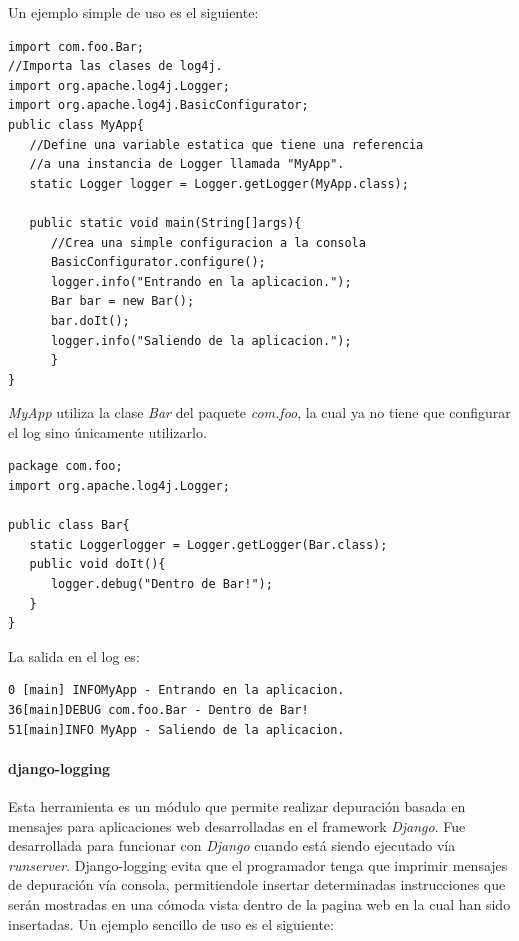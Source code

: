 \documentclass[12pt,legalpaper]{report}
\begin{document}
Un ejemplo simple de uso es el siguiente:
\begin{singlespace}
\begin{lstlisting}
import com.foo.Bar;
//Importa las clases de log4j.
import org.apache.log4j.Logger;
import org.apache.log4j.BasicConfigurator;
public class MyApp{
   //Define una variable estatica que tiene una referencia
   //a una instancia de Logger llamada "MyApp".
   static Logger logger = Logger.getLogger(MyApp.class);

   public static void main(String[]args){
      //Crea una simple configuracion a la consola
      BasicConfigurator.configure();
      logger.info("Entrando en la aplicacion.");
      Bar bar = new Bar();
      bar.doIt();
      logger.info("Saliendo de la aplicacion.");	
      }
}	
\end{lstlisting}
\end{singlespace}
	
\textit{MyApp} utiliza la clase \textit{Bar} del paquete \textit{com.foo}, la cual ya no tiene que configurar el log sino únicamente utilizarlo.

\begin{singlespace}
\begin{lstlisting}
package com.foo;
import org.apache.log4j.Logger;

public class Bar{
   static Loggerlogger = Logger.getLogger(Bar.class);
   public void doIt(){
      logger.debug("Dentro de Bar!");
   }
}
\end{lstlisting}
\end{singlespace}
	
La salida en el log es:

\begin{singlespace}
\begin{lstlisting}[style=consola,numbers=none]
0 [main] INFOMyApp - Entrando en la aplicacion.
36[main]DEBUG com.foo.Bar - Dentro de Bar!
51[main]INFO MyApp - Saliendo de la aplicacion.	
\end{lstlisting}
\end{singlespace}
				\paragraph{django-logging}
				
Esta herramienta \cite{django-logging} es un módulo que permite realizar depuración basada en mensajes para aplicaciones web desarrolladas en el framework \textit{Django}. Fue desarrollada para funcionar con \textit{Django} cuando está siendo ejecutado vía \textit{runserver}.  Django-logging evita que el programador tenga que imprimir mensajes de depuración vía consola, permitiendole insertar determinadas instrucciones que serán mostradas en una cómoda vista dentro de la pagina web en la cual han sido insertadas.  						
Un ejemplo sencillo de uso es el siguiente:
\end{document}
